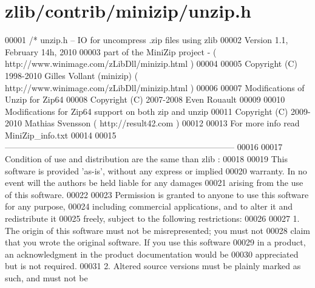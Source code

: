 \hypertarget{zlib_2contrib_2minizip_2unzip_8h_source}{}\section{zlib/contrib/minizip/unzip.h}
\label{zlib_2contrib_2minizip_2unzip_8h_source}

\begin{DoxyCode}
00001 \textcolor{comment}{/* unzip.h -- IO for uncompress .zip files using zlib}
00002 \textcolor{comment}{   Version 1.1, February 14h, 2010}
00003 \textcolor{comment}{   part of the MiniZip project - ( http://www.winimage.com/zLibDll/minizip.html )}
00004 \textcolor{comment}{}
00005 \textcolor{comment}{         Copyright (C) 1998-2010 Gilles Vollant (minizip) ( http://www.winimage.com/zLibDll/minizip.html )}
00006 \textcolor{comment}{}
00007 \textcolor{comment}{         Modifications of Unzip for Zip64}
00008 \textcolor{comment}{         Copyright (C) 2007-2008 Even Rouault}
00009 \textcolor{comment}{}
00010 \textcolor{comment}{         Modifications for Zip64 support on both zip and unzip}
00011 \textcolor{comment}{         Copyright (C) 2009-2010 Mathias Svensson ( http://result42.com )}
00012 \textcolor{comment}{}
00013 \textcolor{comment}{         For more info read MiniZip\_info.txt}
00014 \textcolor{comment}{}
00015 \textcolor{comment}{         ---------------------------------------------------------------------------------}
00016 \textcolor{comment}{}
00017 \textcolor{comment}{        Condition of use and distribution are the same than zlib :}
00018 \textcolor{comment}{}
00019 \textcolor{comment}{  This software is provided 'as-is', without any express or implied}
00020 \textcolor{comment}{  warranty.  In no event will the authors be held liable for any damages}
00021 \textcolor{comment}{  arising from the use of this software.}
00022 \textcolor{comment}{}
00023 \textcolor{comment}{  Permission is granted to anyone to use this software for any purpose,}
00024 \textcolor{comment}{  including commercial applications, and to alter it and redistribute it}
00025 \textcolor{comment}{  freely, subject to the following restrictions:}
00026 \textcolor{comment}{}
00027 \textcolor{comment}{  1. The origin of this software must not be misrepresented; you must not}
00028 \textcolor{comment}{     claim that you wrote the original software. If you use this software}
00029 \textcolor{comment}{     in a product, an acknowledgment in the product documentation would be}
00030 \textcolor{comment}{     appreciated but is not required.}
00031 \textcolor{comment}{  2. Altered source versions must be plainly marked as such, and must not be}

\end{DoxyCode}
